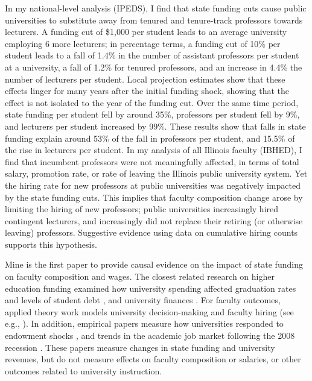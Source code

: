 In my national-level analysis (IPEDS), I find that state funding cuts cause public universities to substitute away from tenured and tenure-track professors towards lecturers.
A funding cut of \$1,000 per student leads to an average university employing 6 more lecturers;
in percentage terms, a funding cut of 10\% per student leads to a fall of 1.4\% in the number of assistant professors per student at a university, a fall of 1.2\% for tenured professors, and an increase in 4.4\% the number of lecturers per student.
Local projection estimates show that these effects linger for many years after the initial funding shock, showing that the effect is not isolated to the year of the funding cut. 
Over the same time period, state funding per student fell by around 35\%, professors per student fell by 9\%, and lecturers per student increased by 99\%.
These results show that falls in state funding explain around 53\% of the fall in professors per student,
and 15.5\% of the rise in lecturers per student.
In my analysis of all Illinois faculty (IBHED), I find that incumbent professors were not meaningfully affected, in terms of total salary, promotion rate, or rate of leaving the Illinois public university system.
Yet the hiring rate for new professors at public universities was negatively impacted by the state funding cuts.
This implies that faculty composition change arose by limiting the hiring of new professors; public universities increasingly hired contingent lecturers, and increasingly did not replace their retiring (or otherwise leaving) professors.
Suggestive evidence using data on cumulative hiring counts supports this hypothesis.

Mine is the first paper to provide causal evidence on the impact of state funding on faculty composition and wages.
The closest related research on higher education funding examined how university spending affected graduation rates and levels of student debt \citep{NBERw23736,NBERw27885}, and university finances \citep{miller2022making,bound2019public,brown2014endowment}.
For faculty outcomes, applied theory work models university decision-making and faculty hiring (see e.g., \citealt{abe2015implications,johnson2009jep,NBERc13879}).
In addition, empirical papers measure how universities responded to endowment shocks \citep{brown2014endowment}, and trends in the academic job market following the 2008 recession \citep{turner2014impact}.
These papers measure changes in state funding and university revenues, but do not measure effects on faculty composition or salaries, or other outcomes related to university instruction.

